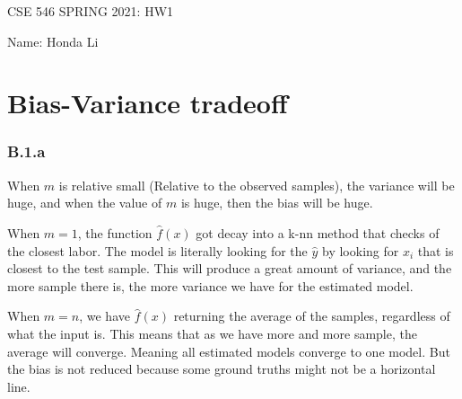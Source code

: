 \documentclass[]{article}
\begin{document}
\begin{center}
	CSE 546 SPRING 2021: HW1 
\end{center}
\begin{center}
	Name: Honda Li
\end{center}

\section*{Bias-Variance tradeoff}
	\subsubsection*{B.1.a}
		\hspace{1.1em}
		When $m$ is relative small (Relative to the observed samples), the variance will be huge, and when the value of $m$ is huge, then the bias will be huge. 
		\par
		When $m = 1$, the function $\hat{f}(x)$ got decay into a k-nn method that checks of the closest labor. The model is literally looking for the $\hat{y}$ by looking for $x_i$ that is closest to the test sample. This will produce a great amount of variance, and the more sample there is, the more variance we have for the estimated model. 
		\par
		When $m = n$, we have $\hat{f}(x)$ returning the average of the samples, regardless of what the input is. This means that as we have more and more sample, the average will converge. Meaning all estimated models converge to one model. But the bias is not reduced because some ground truths might not be a horizontal line. 
\end{document}
